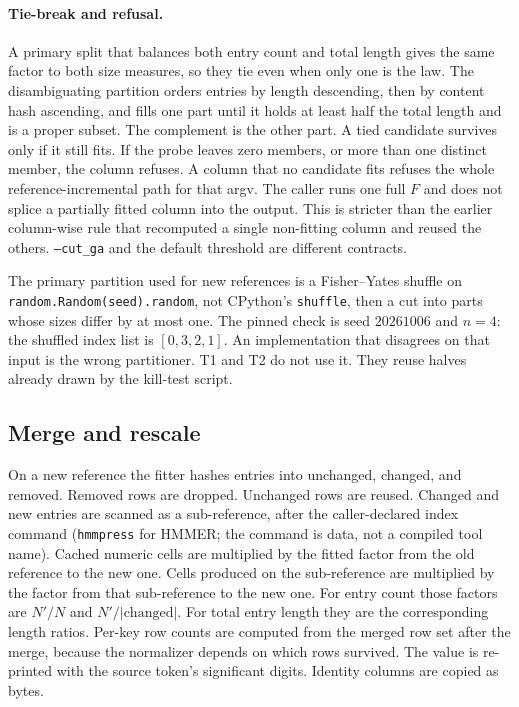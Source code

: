 \documentclass[letterpaper,twocolumn,10pt]{article}
\begin{document}
\paragraph{Tie-break and refusal.}
A primary split that balances both entry count and total length gives the same factor to both size measures, so they tie even when only one is the law.
The disambiguating partition orders entries by length descending, then by content hash ascending, and fills one part until it holds at least half the total length and is a proper subset.
The complement is the other part.
A tied candidate survives only if it still fits.
If the probe leaves zero members, or more than one distinct member, the column refuses.
A column that no candidate fits refuses the whole reference-incremental path for that argv.
The caller runs one full $F$ and does not splice a partially fitted column into the output.
This is stricter than the earlier column-wise rule that recomputed a single non-fitting column and reused the others.
\texttt{--cut\_ga} and the default threshold are different contracts.

The primary partition used for new references is a Fisher--Yates shuffle on \texttt{random.Random(seed).random}, not CPython's \texttt{shuffle}, then a cut into parts whose sizes differ by at most one.
The pinned check is seed
$20261006$
and
$n = 4$:
the shuffled index list is
$[0, 3, 2, 1]$.
An implementation that disagrees on that input is the wrong partitioner.
T1 and T2 do not use it.
They reuse halves already drawn by the kill-test script.

\subsection{Merge and rescale}
\label{sec:merge}

On a new reference the fitter hashes entries into unchanged, changed, and removed.
Removed rows are dropped.
Unchanged rows are reused.
Changed and new entries are scanned as a sub-reference, after the caller-declared index command (\texttt{hmmpress} for HMMER; the command is data, not a compiled tool name).
Cached numeric cells are multiplied by the fitted factor from the old reference to the new one.
Cells produced on the sub-reference are multiplied by the factor from that sub-reference to the new one.
For entry count those factors are $N'/N$ and $N'/|\mathrm{changed}|$.
For total entry length they are the corresponding length ratios.
Per-key row counts are computed from the merged row set after the merge, because the normalizer depends on which rows survived.
The value is re-printed with the source token's significant digits.
Identity columns are copied as bytes.
\end{document}
